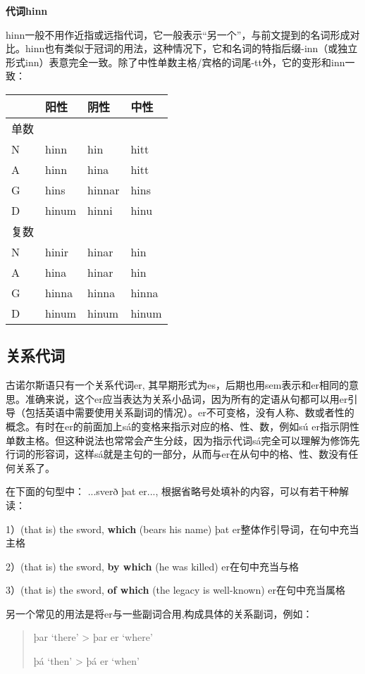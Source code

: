 \textbf{代词hinn}

hinn一般不用作近指或远指代词，它一般表示``另一个''，与前文提到的名词形成对比。hinn也有类似于冠词的用法，这种情况下，它和名词的特指后缀-inn（或独立形式inn）表意完全一致。除了中性单数主格/宾格的词尾-tt外，它的变形和inn一致：

\begin{longtable}{llll}
\toprule
 & 阳性 & 阴性 & 中性 \\
\midrule
\endhead
\bottomrule
\endfoot
单数 & & & \\
N & hinn & hin & hitt \\
A & hinn & hina & hitt \\
G & hins & hinnar & hins \\
D & hinum & hinni & hinu \\
复数 & & & \\
N & hinir & hinar & hin \\
A & hina & hinar & hin \\
G & hinna & hinna & hinna \\
D & hinum & hinum & hinum \\
\end{longtable}

\subsection{关系代词}\label{ux5173ux7cfbux4ee3ux8bcd}

古诺尔斯语只有一个关系代词er,
其早期形式为es，后期也用sem表示和er相同的意思。准确来说，这个er应当表达为关系小品词，因为所有的定语从句都可以用er引导（包括英语中需要使用关系副词的情况）。er不可变格，没有人称、数或者性的概念。有时在er的前面加上sá的变格来指示对应的格、性、数，例如sú
er指示阴性单数主格。但这种说法也常常会产生分歧，因为指示代词sá完全可以理解为修饰先行词的形容词，这样sá就是主句的一部分，从而与er在从句中的格、性、数没有任何关系了。

在下面的句型中： ...sverð þat er...,
根据省略号处填补的内容，可以有若干种解读：

1）(that is) the sword, \textbf{which} (bears his name)‌ þat
er整体作引导词，在句中充当主格

2）(that is) the sword, \textbf{by which} (he was killed)‌
er在句中充当与格

3）(that is) the sword, \textbf{of which} (the legacy is well-known)‌
er在句中充当属格

另一个常见的用法是将er与一些副词合用,构成具体的关系副词，例如：

\begin{quote}
þar `there‌' \textgreater{} þar er `where‌'

þá `then‌' \textgreater{} þá er `when‌'
\end{quote}

